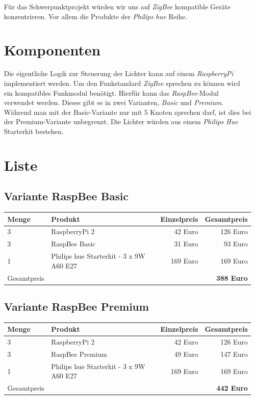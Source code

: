 \documentclass[a4paper,12pt]{article}
\begin{document}
Für das Schwerpunktprojekt würden wir uns auf \textit{ZigBee} kompatible Geräte
konzentrieren. Vor allem die Produkte der \textit{Philips hue} Reihe.

\section{Komponenten}

Die eigentliche Logik zur Steuerung der Lichter kann auf einem \textit{RaspberryPi}
implementiert werden. Um den Funkstandard \textit{ZigBee} sprechen zu können wird ein
kompatibles Funkmodul benötigt. Hierfür kann das \textit{RaspBee}-Modul verwendet werden.
Dieses gibt es in zwei Varianten, \textit{Basic} und \textit{Premium}. Während man mit der
Basic-Variante nur mit 5 Knoten sprechen darf, ist dies bei der Premium-Variante
unbegrenzt. Die Lichter würden aus einem \textit{Philips Hue} Starterkit bestehen.

\section{Liste}

\subsection{Variante RaspBee Basic}

\begin{tabular}{llrr}
   Menge & Produkt & Einzelpreis & Gesamtpreis\\
   \hline
   3 & RaspberryPi 2 & 42 Euro & 126 Euro\\
   3 & RaspBee Basic & 31 Euro & 93 Euro\\
   1 & Philips hue Starterkit - 3 x 9W A60 E27 & 169 Euro & 169 Euro\\
   \hline
   Gesamtpreis & & & \textbf{388 Euro}\\
\end{tabular}

\subsection{Variante RaspBee Premium}

\begin{tabular}{llrr}
   Menge & Produkt & Einzelpreis & Gesamtpreis\\
   \hline
   3 & RaspberryPi 2 & 42 Euro & 126 Euro\\
   3 & RaspBee Premium & 49 Euro & 147 Euro\\
   1 & Philips hue Starterkit - 3 x 9W A60 E27 & 169 Euro & 169 Euro\\
   \hline
   Gesamtpreis & & & \textbf{442 Euro}\\
\end{tabular}
\end{document}
